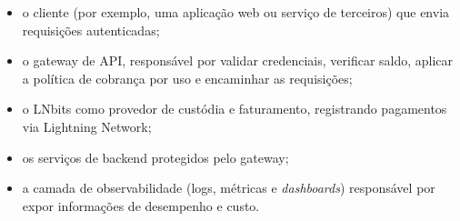 \documentclass[openright]{normas-utf-tex}
\begin{document}
\begin{itemize}
    \item o cliente (por exemplo, uma aplicação web ou serviço de terceiros) que envia requisições autenticadas;
    \item o gateway de API, responsável por validar credenciais, verificar saldo, aplicar a política de cobrança por uso e encaminhar as requisições;
    \item o LNbits como provedor de custódia e faturamento, registrando pagamentos via Lightning Network;
    \item os serviços de backend protegidos pelo gateway;
    \item a camada de observabilidade (logs, métricas e \textit{dashboards}) responsável por expor informações de desempenho e custo.
\end{itemize}
\end{document}
